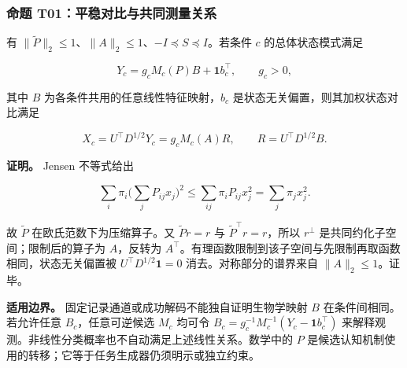 \documentclass[11pt,a4paper]{article}
\begin{document}
\subsubsection{命题
T01：平稳对比与共同测量关系}\label{ux547dux9898-t01ux5e73ux7a33ux5bf9ux6bd4ux4e0eux5171ux540cux6d4bux91cfux5173ux7cfb}

\par
\noindent\begin{minipage}{\linewidth}

有
\(\|\widetilde P\|_2\le1\)、\(\|A\|_2\le1\)、\(-I\preceq S\preceq I\)。若条件
\(c\) 的总体状态模式满足

\[
Y_c=g_c M_c(P)B+\mathbf1b_c^\top,
\qquad g_c>0,
\]

\end{minipage}\par

\par
\noindent\begin{minipage}{\linewidth}

其中 \(B\) 为各条件共用的任意线性特征映射，\(b_c\)
是状态无关偏置，则其加权状态对比满足

\[
X_c=U^\top D^{1/2}Y_c=g_c M_c(A)R,
\qquad R=U^\top D^{1/2}B.
\]

\end{minipage}\par

\par
\noindent\begin{minipage}{\linewidth}

\textbf{证明。} Jensen 不等式给出

\[
\sum_i\pi_i\Big(\sum_jP_{ij}x_j\Big)^2
\le\sum_{ij}\pi_iP_{ij}x_j^2
=\sum_j\pi_jx_j^2.
\]

\end{minipage}\par

故 \(\widetilde P\) 在欧氏范数下为压缩算子。又 \(\widetilde P r=r\) 与
\(\widetilde P^\top r=r\)，所以 \(r^\perp\)
是共同约化子空间；限制后的算子为 \(A\)，反转为
\(A^\top\)。有理函数限制到该子空间与先限制再取函数相同，状态无关偏置被
\(U^\top D^{1/2}\mathbf1=0\) 消去。对称部分的谱界来自
\(\|A\|_2\le1\)。证毕。

\textbf{适用边界。} 固定记录通道或成功解码不能独自证明生物学映射 \(B\)
在条件间相同。若允许任意 \(B_c\)，任意可逆候选 \(M_c\) 均可令
\(B_c=g_c^{-1}M_c^{-1}(Y_c-\mathbf1b_c^\top)\)
来解释观测。非线性分类概率也不自动满足上述线性关系。数学中的 \(P\)
是候选认知机制使用的转移；它等于任务生成器仍须明示或独立约束。
\end{document}
